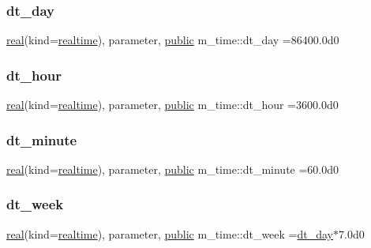 \begin{DoxyVerb}
\subsubsection{\texorpdfstring{dt\+\_\+day}{dt\_day}}
{\footnotesize\ttfamily \hyperlink{read__watch_83_8txt_abdb62bde002f38ef75f810d3a905a823}{real}(kind=\hyperlink{namespacem__time_ac10ea9e8d59ec74eaa7d89f2517d7422}{realtime}), parameter, \hyperlink{M__stopwatch_83_8txt_a2f74811300c361e53b430611a7d1769f}{public} m\+\_\+time\+::dt\+\_\+day =86400.\+0d0}

\mbox{\label{namespacem__time_aa0ca2172092f5e7dcc9b8524e6516fd8}} 
\subsubsection{\texorpdfstring{dt\+\_\+hour}{dt\_hour}}
{\footnotesize\ttfamily \hyperlink{read__watch_83_8txt_abdb62bde002f38ef75f810d3a905a823}{real}(kind=\hyperlink{namespacem__time_ac10ea9e8d59ec74eaa7d89f2517d7422}{realtime}), parameter, \hyperlink{M__stopwatch_83_8txt_a2f74811300c361e53b430611a7d1769f}{public} m\+\_\+time\+::dt\+\_\+hour =3600.\+0d0}

\mbox{\label{namespacem__time_a9fe6fbb44e2779a2fcf96fba36c08918}} 
\subsubsection{\texorpdfstring{dt\+\_\+minute}{dt\_minute}}
{\footnotesize\ttfamily \hyperlink{read__watch_83_8txt_abdb62bde002f38ef75f810d3a905a823}{real}(kind=\hyperlink{namespacem__time_ac10ea9e8d59ec74eaa7d89f2517d7422}{realtime}), parameter, \hyperlink{M__stopwatch_83_8txt_a2f74811300c361e53b430611a7d1769f}{public} m\+\_\+time\+::dt\+\_\+minute =60.\+0d0}

\mbox{\label{namespacem__time_a3d53519e90264faccdae67e389ffc003}} 
\subsubsection{\texorpdfstring{dt\+\_\+week}{dt\_week}}
{\footnotesize\ttfamily \hyperlink{read__watch_83_8txt_abdb62bde002f38ef75f810d3a905a823}{real}(kind=\hyperlink{namespacem__time_ac10ea9e8d59ec74eaa7d89f2517d7422}{realtime}), parameter, \hyperlink{M__stopwatch_83_8txt_a2f74811300c361e53b430611a7d1769f}{public} m\+\_\+time\+::dt\+\_\+week =\hyperlink{namespacem__time_a97725f8d657c24badff19a794f323a6b}{dt\+\_\+day}$\ast$7.\+0d0}


\end{DoxyVerb}
